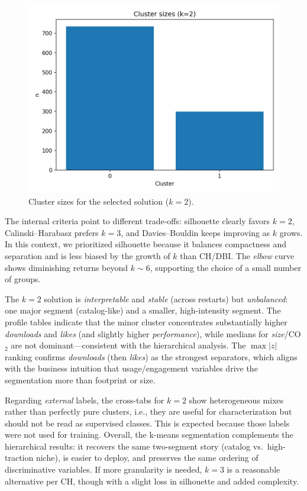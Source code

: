 \documentclass[journal]{IEEEtran}
\begin{document}
\begin{figure}[H]
	\centering
	\includegraphics[width=.55\linewidth]{assets/cluster_sizes_k2.png}
	\caption{Cluster sizes for the selected solution ($k{=}2$).}
	\label{fig:sizes-k2}
\end{figure}
The internal criteria point to different trade-offs:
silhouette clearly favors \textbf{$k{=}2$}, Calinski--Harabasz prefers \textbf{$k{=}3$},
and Davies--Bouldin keeps improving as $k$ grows. In this context, we prioritized
silhouette because it balances compactness and separation and is less biased by the growth
of $k$ than CH/DBI. The \emph{elbow} curve shows diminishing returns beyond $k{\sim}6$,
supporting the choice of a small number of groups.

The $k{=}2$ solution is \emph{interpretable} and \emph{stable} (across restarts) but
\emph{unbalanced}: one major segment (catalog-like) and a smaller, high-intensity segment.
The profile tables indicate that the minor cluster concentrates substantially higher
\emph{downloads} and \emph{likes} (and slightly higher \emph{performance}), while medians for
\emph{size}/CO$_2$ are not dominant—consistent with the hierarchical analysis.
The $\max|z|$ ranking confirms \textit{downloads} (then \textit{likes}) as the strongest
separators, which aligns with the business intuition that usage/engagement variables
drive the segmentation more than footprint or size.

Regarding \emph{external} labels, the cross-tabs for $k{=}2$ show heterogeneous mixes
rather than perfectly pure clusters, i.e., they are useful for characterization but should
not be read as supervised classes. This is expected because those labels were not used for
training. Overall, the k-means segmentation complements the hierarchical results:
it recovers the same two-segment story (catalog vs.\ high-traction niche), is easier to
deploy, and preserves the same ordering of discriminative variables. If more granularity
is needed, $k{=}3$ is a reasonable alternative per CH, though with a slight loss in
silhouette and added complexity.
\end{document}
